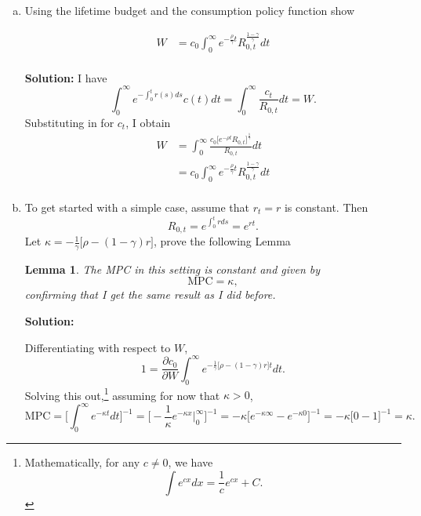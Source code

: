 \documentclass[11pt]{extarticle}
\theoremstyle{plain}
\newtheorem{lem}[thm]{Lemma}
\theoremstyle{definition}
\begin{document}
\begin{enumerate}[(a)]

\item Using the lifetime budget and the consumption policy function show

\begin{align*}
	W &= c_0 \int_0^\infty e^{- \frac{\rho}{\gamma} t} R_{0,t}^\frac{1-\gamma}{\gamma} dt \\
\end{align*}

\textbf{Solution:}
I have
\begin{equation*}
	\int_0^\infty e^{- \int_0^t r(s) ds }   c(t) dt = \int_0^\infty \frac{c_t}{R_{0,t}} dt = W.
\end{equation*}
Substituting in for $c_t$, I obtain
\begin{align*}
	W &= \int_0^\infty \frac{c_0 \big[ e^{- \rho t} R_{0,t} \big]^\frac{1}{\gamma} }{R_{0,t}} dt \\
	&= c_0 \int_0^\infty e^{- \frac{\rho}{\gamma} t} R_{0,t}^\frac{1-\gamma}{\gamma} dt \\
\end{align*}

\item To get started with a simple case, assume that $r_t = r$ is constant. Then 
\begin{equation*}
	R_{0,t} = e^{\int_0^t r ds } = e^{ r t}.
\end{equation*}
Let $\kappa =- \frac{1}{\gamma} \big[ \rho - (1-\gamma) r \big] $, prove the following Lemma

\vspace{3mm}
\noindent
\begin{lem}
	The MPC in this setting is constant and given by
	\begin{equation*}
		\text{MPC} = \kappa,
	\end{equation*}
	confirming that I get the same result as I did before. 
\end{lem}

\textbf{Solution:}

Differentiating with respect to $W$, 
\begin{equation*}
	1 = \frac{\partial c_0}{\partial W} \int_0^\infty e^{- \frac{1}{\gamma} \big[ \rho - (1-\gamma) r \big] t }  dt.
\end{equation*}
Solving this out,\footnote{
	Mathematically, for any $c \neq 0$, we have 
	\begin{equation*}
		\int e^{c x} dx = \frac{1}{c} e^{cx} + C. 
	\end{equation*}
} assuming for now that $\kappa > 0$, 
\begin{equation*}
	\text{MPC} = \bigg[\int_0^\infty e^{- \kappa t }  dt\bigg]^{-1}  = \bigg[ - \frac{1}{\kappa} e^{- \kappa x}  \bigg|_0^\infty  \bigg]^{-1}  = - \kappa \bigg[e^{- \kappa \infty }  - e^{- \kappa 0}  \bigg]^{-1} = - \kappa \bigg[0 - 1  \bigg]^{-1} = \kappa. 
\end{equation*}

\end{enumerate}
\end{document}
